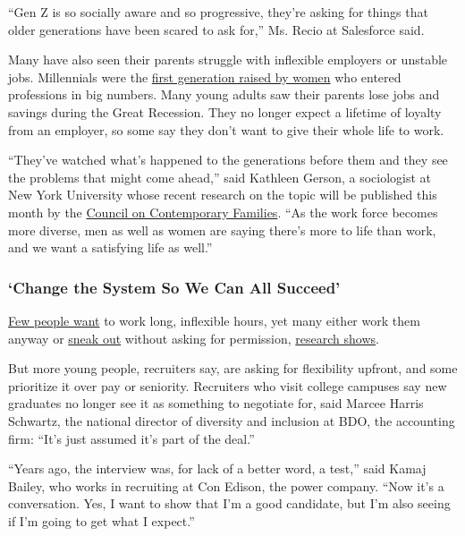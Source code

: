 ``Gen Z is so socially aware and so progressive, they're asking for
things that older generations have been scared to ask for,'' Ms. Recio
at Salesforce said.

Many have also seen their parents struggle with inflexible employers or
unstable jobs. Millennials were the
\href{https://www.nytimes.com/2015/07/23/upshot/more-than-their-mothers-young-women-plan-career-pauses.html}{first
generation raised by women} who entered professions in big numbers. Many
young adults saw their parents lose jobs and savings during the Great
Recession. They no longer expect a lifetime of loyalty from an employer,
so some say they don't want to give their whole life to work.

``They've watched what's happened to the generations before them and
they see the problems that might come ahead,'' said Kathleen Gerson, a
sociologist at New York University whose recent research on the topic
will be published this month by the
\href{https://contemporaryfamilies.org/wp-content/uploads/2019/09/Parents-Cant-Go-It-Alone-Symposium-2019-Full.pdf}{Council
on Contemporary Families}. ``As the work force becomes more diverse, men
as well as women are saying there's more to life than work, and we want
a satisfying life as well.''

\hypertarget{change-the-system-so-we-can-all-succeed}{%
\subsubsection{`Change the System So We Can All
Succeed'}\label{change-the-system-so-we-can-all-succeed}}

\href{https://www.rand.org/pubs/research_briefs/RB9973.html}{Few people
want} to work long, inflexible hours, yet many either work them anyway
or
\href{https://www.nytimes.com/2015/05/05/upshot/how-some-men-fake-an-80-hour-workweek-and-why-it-matters.html}{sneak
out} without asking for permission,
\href{https://pubsonline.informs.org/doi/abs/10.1287/orsc.2015.0975}{research
shows}.

But more young people, recruiters say, are asking for flexibility
upfront, and some prioritize it over pay or seniority. Recruiters who
visit college campuses say new graduates no longer see it as something
to negotiate for, said Marcee Harris Schwartz, the national director of
diversity and inclusion at BDO, the accounting firm: ``It's just assumed
it's part of the deal.''

``Years ago, the interview was, for lack of a better word, a test,''
said Kamaj Bailey, who works in recruiting at Con Edison, the power
company. ``Now it's a conversation. Yes, I want to show that I'm a good
candidate, but I'm also seeing if I'm going to get what I expect.''

